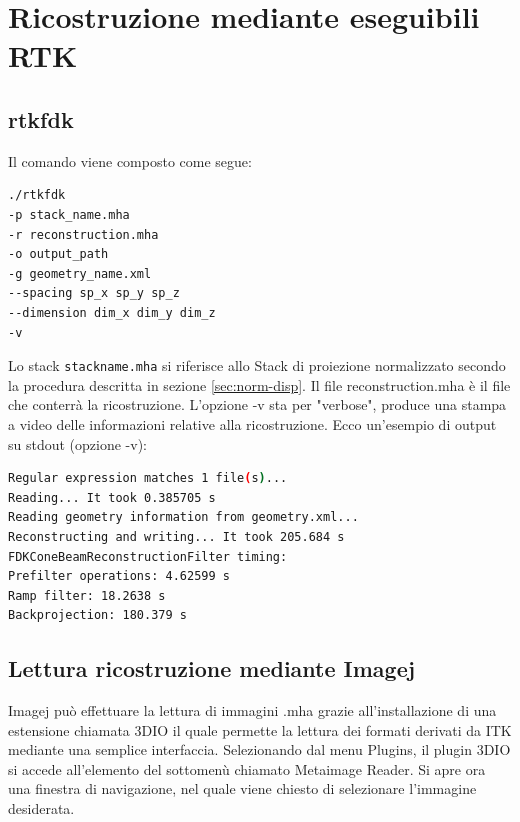 \documentclass[a4paper,12pt, doubleside]{report}
\begin{document}
            
        \section{Ricostruzione mediante eseguibili RTK}
            \subsection{rtkfdk}
                \par
                    Il comando viene composto come segue:
                    \begin{lstlisting}[language=bash, frame=bt]
./rtkfdk 
-p stack_name.mha 
-r reconstruction.mha
-o output_path 
-g geometry_name.xml 
--spacing sp_x sp_y sp_z 
--dimension dim_x dim_y dim_z 
-v
                    \end{lstlisting}
            
                    Lo stack \texttt{stack\textunderscore name.mha} si riferisce allo Stack di proiezione normalizzato secondo la procedura descritta in sezione \ref{sec:norm-disp}. Il file reconstruction.mha è il file che conterrà la ricostruzione. L'opzione -v sta per "verbose", produce una stampa a video delle informazioni relative alla ricostruzione.
                    Ecco un'esempio di output su stdout (opzione -v):
                    \begin{lstlisting}[language=bash, frame=bt]
Regular expression matches 1 file(s)...
Reading... It took 0.385705 s
Reading geometry information from geometry.xml...
Reconstructing and writing... It took 205.684 s
FDKConeBeamReconstructionFilter timing:
Prefilter operations: 4.62599 s
Ramp filter: 18.2638 s
Backprojection: 180.379 s
                    \end{lstlisting}
            \subsection{Lettura ricostruzione mediante Imagej}
                \par
                    Imagej può effettuare la lettura di immagini .mha grazie all'installazione di una estensione chiamata 3DIO\cite{imagej-3dio-plugin} il quale permette la lettura dei formati derivati da ITK mediante una semplice interfaccia.
                    Selezionando dal menu Plugins, il plugin 3DIO si accede all'elemento del sottomenù chiamato Metaimage Reader. Si apre ora una finestra di navigazione, nel quale viene chiesto di selezionare l'immagine desiderata.
                    
\end{document}
